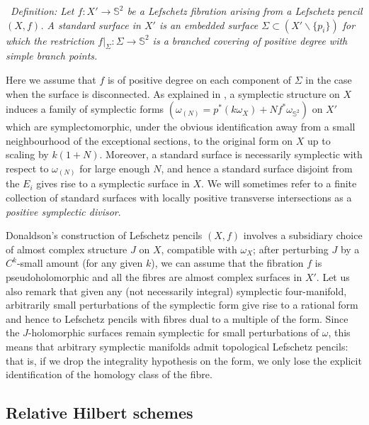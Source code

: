 \documentclass[10pt]{article}
\newcommand{\sss}{\mathbb{S}}
\newcounter{Universal}[section]
\renewcommand{\theUniversal}{\thesection.\arabic{Universal}}
\newenvironment{Italic}{\refstepcounter{Universal} \par \vspace{0.5cm}
\noindent {\bf (\theUniversal)}\ \it}{\par \vspace{0.5cm}}
\newenvironment{Defn}{\begin{Italic}{\sc Definition: } }{\end{Italic}}
\begin{document}
\begin{Defn} \label{standardsurface}
Let $f: X' \rightarrow \sss^2$ be a Lefschetz fibration arising from a
Lefschetz pencil $(X,f)$.  A \emph{standard surface} in $X'$ is an
embedded surface $\Sigma \subset (X' \backslash \{ p_i \})$ for which
the restriction $f|_{\Sigma}: \Sigma \rightarrow \sss^2$ is a branched
covering of positive degree with simple branch points.
\end{Defn}

\noindent Here we assume that $f$ is of positive degree on each
component of $\Sigma$ in the case when the surface is disconnected.
As explained in \cite{SKDIS}, a symplectic structure on $X$ induces
a family of symplectic forms $(\omega_{(N)} = p^* (k\omega_X) + N f^*
\omega_{\sss^2})$  on $X'$ which are
symplectomorphic, under the obvious identification away from a small
neighbourhood of
the exceptional sections, to the
original form on $X$ up to scaling by $k(1+N)$.  Moreover, a standard
surface is necessarily symplectic with 
respect to $\omega_{(N)}$ for large enough $N$, and hence a standard
surface disjoint from the $E_i$ gives  rise to a symplectic surface in
$X$.  We will sometimes refer to a finite collection of
standard surfaces with locally positive transverse
intersections as a \emph{positive symplectic divisor}.

\vspace{0.2cm}

\noindent Donaldson's construction of Lefschetz pencils $(X,f)$
involves a subsidiary choice of almost complex structure $J$ on $X$,
compatible with $\omega_X$;  after perturbing $J$ by a $C^k$-small
amount (for any given $k$), we can assume that the fibration $f$ is
pseudoholomorphic and 
all the fibres are almost complex surfaces in $X'$.  Let us also
remark that given any (not necessarily integral) symplectic
four-manifold, arbitrarily small perturbations of the symplectic form
give rise to a rational form and hence to Lefschetz pencils with
fibres dual to a multiple of the form.  Since the $J$-holomorphic
surfaces remain symplectic for small perturbations of $\omega$, this
means that arbitrary symplectic manifolds admit topological  Lefschetz
pencils: that is, if we drop the integrality hypothesis on the form,
we only lose the explicit identification of the homology class of the
fibre.


\subsection{Relative Hilbert schemes}
\end{document}
